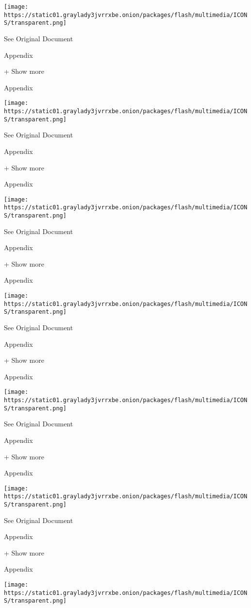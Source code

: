 \texttt{[image: https://static01.graylady3jvrrxbe.onion/packages/flash/multimedia/ICONS/transparent.png]}

See Original Document

Appendix

+ Show more

Appendix

\protect\hyperlink{}{}

\texttt{[image: https://static01.graylady3jvrrxbe.onion/packages/flash/multimedia/ICONS/transparent.png]}

See Original Document

Appendix

+ Show more

Appendix

\protect\hyperlink{}{}

\texttt{[image: https://static01.graylady3jvrrxbe.onion/packages/flash/multimedia/ICONS/transparent.png]}

See Original Document

Appendix

+ Show more

Appendix

\protect\hyperlink{}{}

\texttt{[image: https://static01.graylady3jvrrxbe.onion/packages/flash/multimedia/ICONS/transparent.png]}

See Original Document

Appendix

+ Show more

Appendix

\protect\hyperlink{}{}

\texttt{[image: https://static01.graylady3jvrrxbe.onion/packages/flash/multimedia/ICONS/transparent.png]}

See Original Document

Appendix

+ Show more

Appendix

\protect\hyperlink{}{}

\texttt{[image: https://static01.graylady3jvrrxbe.onion/packages/flash/multimedia/ICONS/transparent.png]}

See Original Document

Appendix

+ Show more

Appendix

\protect\hyperlink{}{}

\texttt{[image: https://static01.graylady3jvrrxbe.onion/packages/flash/multimedia/ICONS/transparent.png]}

